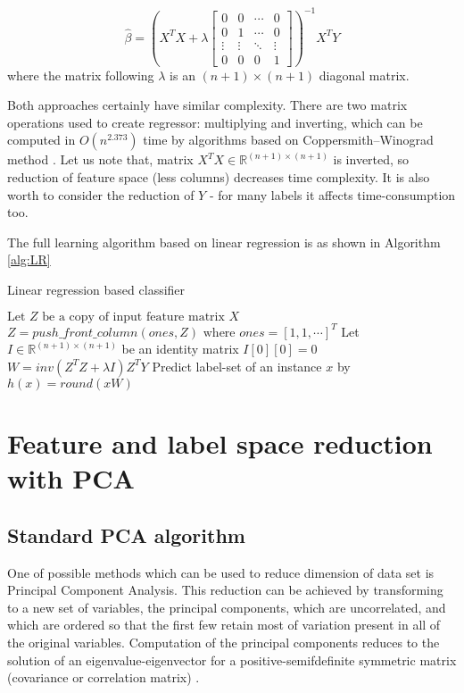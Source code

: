 \begin{equation}\label{eq:LR3}
    \hat{\beta} = (X^TX+\lambda
        \begin{bmatrix}
        0 & 0 & \cdots & 0 \\
        0 & 1 & \cdots & 0 \\
        \vdots & \vdots & \ddots & \vdots \\
        0 & 0 & 0 & 1
        \end{bmatrix}
    )^{-1}X^TY
\end{equation}
where the matrix following $\lambda$ is an $(n+1)\times(n+1)$ diagonal matrix.  

Both approaches certainly have similar complexity. There are two matrix operations used to create regressor: multiplying and inverting, which can be computed in $O(n^{2.373})$ time by algorithms based on Coppersmith–Winograd method \cite{VVW}. Let us note that, matrix $X^TX \in \mathbb{R}^{(n+1) \times (n+1)}$ is inverted, so reduction of feature space (less columns) decreases time complexity. It is also worth to consider the reduction of $Y$ - for many labels it affects time-consumption too.   

The full learning algorithm based on linear regression is as shown in Algorithm \ref{alg:LR} 

\begin{algorithm}
    \caption{Linear regression based classifier}\label{alg:LR}
    \begin{algorithmic}[1]
    \State $\text{Let } Z \text{ be a copy of input feature matrix } X$
    \State $Z=push\_front\_column(ones, Z) \text{ where } ones=[1, 1, \cdots]^T$
    \State Let $I \in \mathbb{R}^{(n+1) \times (n+1)}$ be an identity matrix
    \State $I[0][0] = 0$
    \State $W=inv(Z^TZ+\lambda I)Z^TY$
    \State Predict label-set of an instance $x$ by $h(x)=round(xW)$ 
    \end{algorithmic}
\end{algorithm}


\section{Feature and label space reduction with PCA}

\subsection{Standard PCA algorithm}

One of possible methods which can be used to reduce dimension of data set is Principal Component Analysis. This reduction can be achieved by transforming to a new set of variables, the principal components, which are uncorrelated, and which are ordered so that the first few retain most of variation present in all of the original variables. Computation of the principal components reduces to the solution of an eigenvalue-eigenvector for a positive-semifdefinite symmetric matrix (covariance or correlation matrix) \cite{Jolliffe}.

